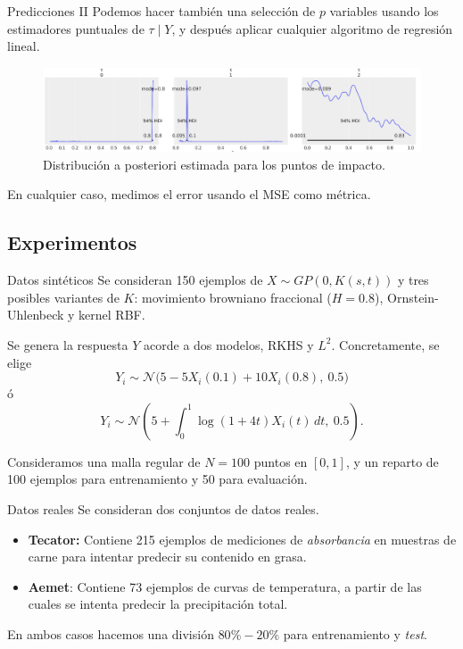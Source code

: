 \documentclass[10pt, spanish, professionalfonts]{beamer}
\begin{document}
\begin{frame}{Predicciones II}
    Podemos hacer también una selección de \(p\) variables usando los estimadores puntuales de \(\tau \mid Y\), y después aplicar cualquier algoritmo de regresión lineal.

    \begin{figure}
      \includegraphics[width=\textwidth]{img/tau_posterior_lin}
      \caption{Distribución a posteriori estimada para los puntos de impacto.}
    \end{figure}

    En cualquier caso, medimos el error usando el MSE como métrica.
\end{frame}

\subsection{Experimentos}

\begin{frame}{Datos sintéticos}
  Se consideran 150 ejemplos de \(X \sim GP(0, K(s, t))\) y tres posibles variantes de \(K\): movimiento browniano fraccional (\(H=0.8\)), Ornstein-Uhlenbeck y kernel RBF.

  Se genera la respuesta \(Y\) acorde a dos modelos, RKHS y \(L^2\). Concretamente, se elige
  \[
    Y_i \sim \mathcal N\big(5 -5X_i(0.1) + 10X_i(0.8), \ 0.5\big)
  \]
  ó
  \[
    Y_i \sim \mathcal N\left(5 + \int_0^1 \log(1+4t)X_i(t)\, dt, \ 0.5\right).
  \]

Consideramos una malla regular de \(N=100\) puntos en \([0, 1]\), y un reparto de 100 ejemplos para entrenamiento y 50 para evaluación.
\end{frame}

\begin{frame}{Datos reales}
  Se consideran dos conjuntos de datos reales.
  \begin{itemize}
    \item \textbf{Tecator:} Contiene 215 ejemplos de mediciones de \textit{absorbancia} en muestras de carne para intentar predecir su contenido en grasa.
    \item \textbf{Aemet}: Contiene 73 ejemplos de curvas de temperatura, a partir de las cuales se intenta predecir la precipitación total.
  \end{itemize}

  En ambos casos hacemos una división \(80\%-20\%\) para entrenamiento y \textit{test}.
\end{frame}
\end{document}
